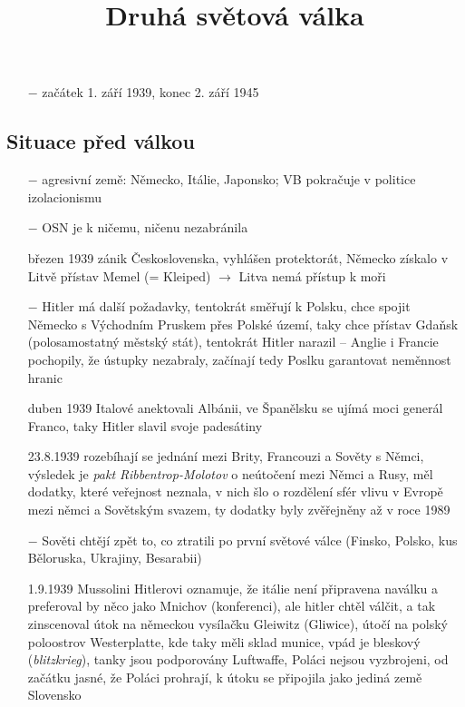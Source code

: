 \documentclass{article}
\title{\vspace{-2cm}Druhá světová válka\vspace{-1.7cm}}
\date{}
\author{}
\begin{document}
\maketitle

\begin{itemize}
    \vspace{-0.5em}
    \setlength\itemsep{0.15em}
    \item[$-$] začátek 1. září 1939, konec 2. září 1945
\end{itemize}
\subsection*{Situace před válkou}
\begin{itemize}
    \vspace{-0.5em}
    \setlength\itemsep{0.15em}
    \item[$-$] agresivní země: Německo, Itálie, Japonsko; VB pokračuje v politice izolacionismu
    \item[$-$] OSN je k ničemu, ničenu nezabránila
    \item[březen 1939] zánik Československa, vyhlášen protektorát, Německo získalo v Litvě přístav Memel (= Kleiped) $\rightarrow$ Litva nemá přístup k moři
    \item[$-$] Hitler má další požadavky, tentokrát směřují k Polsku, chce spojit Německo s Východním Pruskem přes Polské území, taky chce přístav Gdaňsk (polosamostatný městský stát), tentokrát Hitler narazil -- Anglie i Francie pochopily, že ústupky nezabraly, začínají tedy Poslku garantovat neměnnost hranic
    \item[duben 1939] Italové anektovali Albánii, ve Španělsku se ujímá moci generál Franco, taky Hitler slavil svoje padesátiny
    \item[23.8.1939] rozebíhají se jednání mezi Brity, Francouzi a Sověty s Němci, výsledek je \textit{pakt Ribbentrop-Molotov} o neútočení mezi Němci a Rusy, měl dodatky, které veřejnost neznala, v nich šlo o rozdělení sfér vlivu v Evropě mezi němci a Sovětským svazem, ty dodatky byly zvěřejněny až v roce 1989
    \item[$-$] Sověti chtějí zpět to, co ztratili po první světové válce (Finsko, Polsko, kus Běloruska, Ukrajiny, Besarabii)
    \item[1.9.1939] Mussolini Hitlerovi oznamuje, že itálie není připravena naválku a preferoval by něco jako Mnichov (konferenci), ale hitler chtěl válčit, a tak zinscenoval útok na německou vysílačku Gleiwitz (Gliwice), útočí na polský poloostrov Westerplatte, kde taky měli sklad munice, vpád je bleskový (\textit{blitzkrieg}), tanky jsou podporovány Luftwaffe, Poláci nejsou vyzbrojeni, od začátku jasné, že Poláci prohrají, k útoku se připojila jako jediná země Slovensko

\end{itemize}
\end{document}

